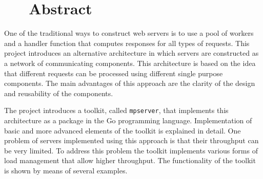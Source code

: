 \section*{\hfil \ \ \ Abstract \hfil}
One of the traditional ways to construct web servers is to use
a pool of workers and a handler function that computes responses
for all types of requests.
This project introduces an alternative architecture in which 
servers are constructed as a network of communicating components.
This architecture is based on the idea that different requests 
can be processed using different single purpose components.
The main advantages of this approach are the clarity of the design 
and reusability of the components.

The project introduces a toolkit,
called \texttt{mpserver}, that implements this architecture as a 
package in the Go programming language. Implementation of basic and 
more advanced elements of the toolkit is explained in detail. 
One problem of servers implemented using this approach is that 
their throughput can be very limited.
To address this problem the toolkit implements 
various forms of load management that allow higher throughput. 
The functionality of the toolkit is shown by means of several
examples.